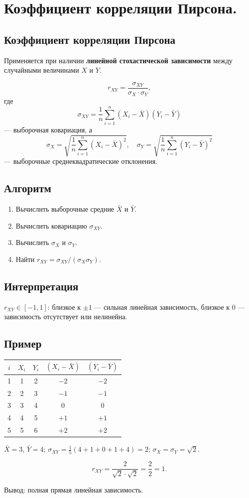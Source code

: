 \section{Коэффициент корреляции Пирсона.}

\subsection*{Коэффициент корреляции Пирсона}

Применяется при наличии \textbf{линейной стохастической зависимости} между случайными величинами $X$ и $Y$.

\[
  r_{XY} = \frac{\sigma_{XY}}{\sigma_X \cdot \sigma_Y},
\]
где
\[
  \sigma_{XY} = \frac{1}{n}\sum_{i=1}^n (X_i - \bar{X})(Y_i - \bar{Y})
\]
— выборочная ковариация, а
\[
  \sigma_X = \sqrt{\frac{1}{n}\sum_{i=1}^n (X_i - \bar{X})^2}, \quad
  \sigma_Y = \sqrt{\frac{1}{n}\sum_{i=1}^n (Y_i - \bar{Y})^2}
\]
— выборочные среднеквадратические отклонения.

\subsection*{Алгоритм}

\begin{enumerate}
  \item Вычислить выборочные средние $\bar{X}$ и $\bar{Y}$.
  \item Вычислить ковариацию $\sigma_{XY}$.
  \item Вычислить $\sigma_X$ и $\sigma_Y$.
  \item Найти $r_{XY} = \sigma_{XY}/(\sigma_X\sigma_Y)$.
\end{enumerate}

\subsection*{Интерпретация}

$r_{XY} \in [-1, 1]$: близкое к $\pm1$ — сильная линейная зависимость, близкое к $0$ — зависимость отсутствует или нелинейна.

\subsection*{Пример}

\begin{center}
\begin{tabular}{ccccc}
  \hline
  $i$ & $X_i$ & $Y_i$ & $(X_i-\bar{X})$ & $(Y_i-\bar{Y})$ \\
  \hline
  1 & 1 & 2 & $-2$ & $-2$ \\
  2 & 2 & 3 & $-1$ & $-1$ \\
  3 & 3 & 4 & $0$ & $0$ \\
  4 & 4 & 5 & $+1$ & $+1$ \\
  5 & 5 & 6 & $+2$ & $+2$ \\
  \hline
\end{tabular}
\end{center}

$\bar{X}=3$, $\bar{Y}=4$;
$\sigma_{XY} = \frac{1}{5}(4+1+0+1+4)=2$;
$\sigma_X=\sigma_Y=\sqrt{2}$.

\[
  r_{XY} = \frac{2}{\sqrt{2}\cdot\sqrt{2}} = \frac{2}{2} = 1.
\]

Вывод: полная прямая линейная зависимость.

\clearpage
